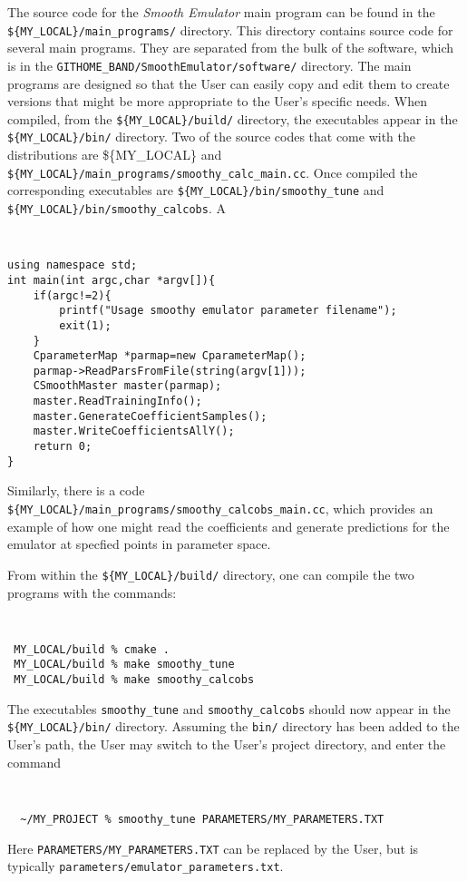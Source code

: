 \documentclass[UserManual.tex]{subfiles}
\begin{document}
The source code for the {\it Smooth Emulator} main program can be found in the {\tt \$\{MY\_LOCAL\}/main\_programs/} directory. This directory contains source code for several main programs. They are separated from the bulk of the software, which is in the {\tt GITHOME\_BAND/SmoothEmulator/software/} directory. The main programs are designed so that the User can easily copy and edit them to create versions that might be more appropriate to the User's specific needs. When compiled, from the {\tt \$\{MY\_LOCAL\}/build/} directory, the executables appear in the {\tt \$\{MY\_LOCAL\}/bin/} directory. Two of the source codes that come with the distributions are \$\{MY\_LOCAL\} and {\tt \$\{MY\_LOCAL\}/main\_programs/smoothy\_calc\_main.cc}. Once compiled the corresponding executables are {\tt \$\{MY\_LOCAL\}/bin/smoothy\_tune} and {\tt \$\{MY\_LOCAL\}/bin/smoothy\_calcobs}. A 
{\tt
\begin{verbatim}
using namespace std;
int main(int argc,char *argv[]){
    if(argc!=2){
        printf("Usage smoothy emulator parameter filename");
        exit(1);
    }
    CparameterMap *parmap=new CparameterMap();
    parmap->ReadParsFromFile(string(argv[1]));
    CSmoothMaster master(parmap);
    master.ReadTrainingInfo();
    master.GenerateCoefficientSamples();
    master.WriteCoefficientsAllY();
    return 0;
}
\end{verbatim}
}
Similarly, there is a code {\tt \$\{MY\_LOCAL\}/main\_programs/smoothy\_calcobs\_main.cc}, which provides an example of how one might read the coefficients and generate predictions for the emulator at specfied points in parameter space.

From within the {\tt \$\{MY\_LOCAL\}/build/} directory, one can compile the two programs with the commands:
{\tt
\begin{verbatim}
 MY_LOCAL/build % cmake .
 MY_LOCAL/build % make smoothy_tune
 MY_LOCAL/build % make smoothy_calcobs
\end{verbatim}
}
The executables {\tt smoothy\_tune} and {\tt smoothy\_calcobs} should now appear in the {\tt \$\{MY\_LOCAL\}/bin/} directory. Assuming the {\tt bin/} directory has been added to the User's path, the User may switch to the User's project directory, and enter the command
{\tt
\begin{verbatim}
  ~/MY_PROJECT % smoothy_tune PARAMETERS/MY_PARAMETERS.TXT
\end{verbatim}
}
Here {\tt PARAMETERS/MY\_PARAMETERS.TXT} can be replaced by the User, but is typically {\tt parameters/emulator\_parameters.txt}.
\end{document}
